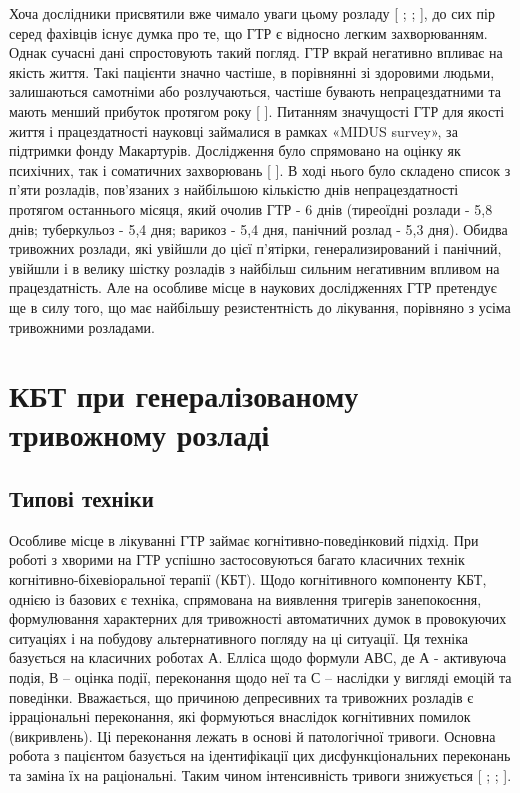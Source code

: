 Хоча дослідники присвятили вже чимало уваги цьому розладу [
\cite{bib7};
\cite{bib8};
\cite{bib9}], до сих пір серед фахівців існує думка про те, що ГТР є відносно легким захворюванням. Однак сучасні дані спростовують такий погляд. ГТР вкрай негативно впливає на якість життя. Такі пацієнти значно частіше, в порівнянні зі здоровими людьми, залишаються самотніми або розлучаються, частіше бувають непрацездатними та мають менший прибуток протягом року [
\cite{bib10}]. Питанням значущості ГТР для якості життя і працездатності науковці займалися в рамках «MIDUS survey», за підтримки фонду Макартурів. Дослідження було спрямовано на оцінку як психічних, так і соматичних захворювань [
\cite{bib11}]. В ході нього було складено список з п'яти розладів, пов'язаних з найбільшою кількістю днів непрацездатності протягом останнього місяця, який очолив ГТР - 6 днів (тиреоїдні розлади - 5,8 днів; туберкульоз - 5,4 дня; варикоз - 5,4 дня, панічний розлад - 5,3 дня). Обидва тривожних розлади, які увійшли до цієї п'ятірки, генерализирований і панічний, увійшли і в велику шістку розладів з найбільш сильним негативним впливом на працездатність. Але на особливе місце в наукових дослідженнях ГТР претендує ще в силу того, що має найбільшу резистентність до лікування, порівняно з усіма тривожними розладами.

\section {КБТ при генералізованому тривожному розладі}
\subsection {Типові техніки}
Особливе місце в лікуванні ГТР займає когнітивно-поведінковий підхід. При роботі з хворими на ГТР успішно застосовуються багато класичних технік когнітивно-біхевіоральної терапії (КБТ). Щодо когнітивного компоненту КБТ, однією із базових є техніка, спрямована на виявлення тригерів занепокоєння, формулювання характерних для тривожності автоматичних думок в провокуючих ситуаціях і на побудову альтернативного погляду на ці ситуації. Ця техніка базується на класичних роботах А. Елліса щодо формули АВС, де А - активуюча подія, В – оцінка події, переконання щодо неї та С – наслідки у вигляді емоцій та поведінки. Вважається, що причиною депресивних та тривожних розладів є ірраціональні переконання, які формуються внаслідок когнітивних помилок (викривлень). Ці переконання лежать в основі й патологічної тривоги. Основна робота з пацієнтом базується на ідентифікації цих дисфункціональних переконань та заміна їх на раціональні. Таким чином інтенсивність тривоги знижується [
\cite{bib12};
\cite{bib13};
\cite{bib14}].

